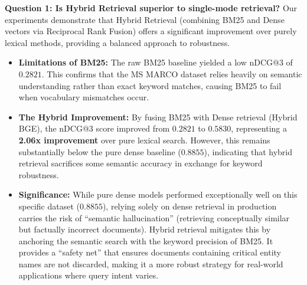\textbf{Question 1: Is Hybrid Retrieval superior to single-mode retrieval?}
Our experiments demonstrate that Hybrid Retrieval (combining BM25 and Dense vectors via Reciprocal Rank Fusion) offers a significant improvement over purely lexical methods, providing a balanced approach to robustness.

\begin{itemize}
    \item \textbf{Limitations of BM25:} The raw BM25 baseline yielded a low nDCG@3 of $0.2821$. This confirms that the MS MARCO dataset relies heavily on semantic understanding rather than exact keyword matches, causing BM25 to fail when vocabulary mismatches occur.
    \item \textbf{The Hybrid Improvement:} By fusing BM25 with Dense retrieval (Hybrid BGE), the nDCG@3 score improved from $0.2821$ to $0.5830$, representing a \textbf{2.06x improvement} over pure lexical search. However, this remains substantially below the pure dense baseline ($0.8855$), indicating that hybrid retrieval sacrifices some semantic accuracy in exchange for keyword robustness.
    \item \textbf{Significance:} While pure dense models performed exceptionally well on this specific dataset ($0.8855$), relying solely on dense retrieval in production carries the risk of ``semantic hallucination'' (retrieving conceptually similar but factually incorrect documents). Hybrid retrieval mitigates this by anchoring the semantic search with the keyword precision of BM25. It provides a ``safety net'' that ensures documents containing critical entity names are not discarded, making it a more robust strategy for real-world applications where query intent varies.
\end{itemize}


